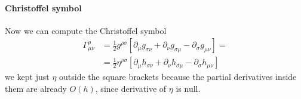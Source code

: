 \paragraph{Christoffel symbol}
Now we can compute the Christoffel symbol
\begin{align}
	\Gamma ^{\rho }_{\mu \nu } &= \frac{1}{2} g^{\rho \sigma }\left[ \partial_{\mu }g_{\sigma \nu } + \partial_{\nu }g_{\sigma \mu } - \partial_{\sigma }g_{\mu \nu } \right] = \nonumber\\
	&= \frac{1}{2} \eta ^{\rho \sigma }\left[ \partial_{\mu }h_{\sigma \nu }+\partial_{\nu }h_{\sigma \mu } - \partial_{\sigma }h_{\mu \nu } \right]
\end{align}
we kept just $\eta $ outside the square brackets because the partial derivatives inside them are already $O\left( h \right)$, since derivative of $\eta $ is null.\par
